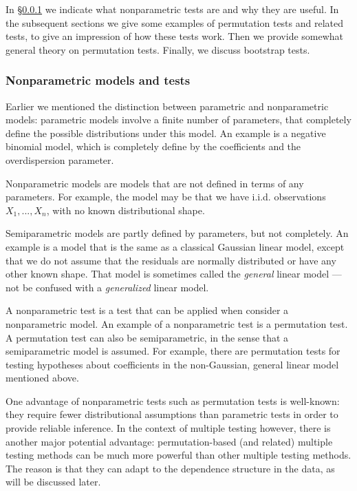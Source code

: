 \documentclass[11pt]{article}
\theoremstyle{plain}
\theoremstyle{definition}
\begin{document}
In \S\ref{secintronptests} we indicate what nonparametric tests are and why they are useful. In the subsequent sections we give some examples of permutation tests and related tests, to give an impression of how these tests work. Then we provide somewhat general theory on permutation tests. Finally, we discuss bootstrap tests.

\subsubsection{Nonparametric models and tests} \label{secintronptests}
Earlier we mentioned the distinction between parametric and nonparametric models: parametric models involve a finite number of parameters, that completely define the possible distributions under this model. An example is a negative binomial model, which is completely define by the coefficients and the overdispersion parameter.

Nonparametric models are models that are not defined in terms of any parameters. For example, the model may be that we have i.i.d. observations $X_1,...,X_n$, with no known distributional shape.

Semiparametric models are partly defined by parameters, but not completely. An example is a model that is the same as a classical Gaussian linear model, except that we do not assume that the residuals are normally distributed or have any other known shape. That model is sometimes called the \emph{general} linear model --- not be confused with a \emph{generalized} linear model.

A nonparametric test is a test that can be applied when consider a nonparametric model. An example of a nonparametric test is a permutation test. A permutation test can also be semiparametric, in the sense that a semiparametric model is assumed. For example, there are permutation tests for testing hypotheses about coefficients in the non-Gaussian, general linear model mentioned above.

One advantage of nonparametric tests such as permutation tests is well-known: they require fewer distributional assumptions than parametric tests in order to provide reliable inference. In the context of multiple testing however, there is another major potential advantage: permutation-based (and related) multiple testing methods can be much more powerful than other multiple testing methods. The reason is that they can adapt to the dependence structure in the data, as will be discussed later.
\end{document}
